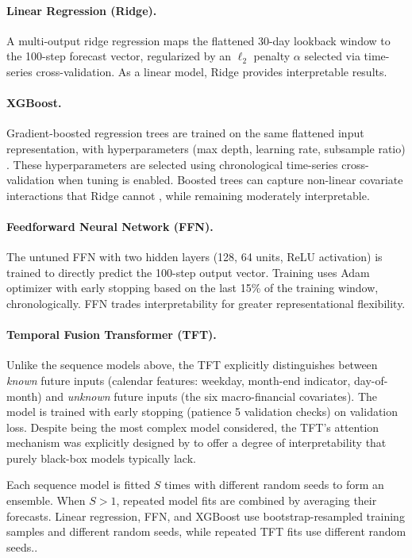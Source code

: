 \documentclass[11pt,a4paper]{article}
\begin{document}
\paragraph{Linear Regression (Ridge).}
A multi-output ridge regression maps the flattened 30-day lookback window
to the 100-step forecast vector, regularized by an $\ell_2$
penalty $\alpha$ selected via time-series cross-validation. As a linear model, Ridge provides interpretable results. 

\paragraph{XGBoost.}
Gradient-boosted regression trees are trained on the same flattened
input representation, with hyperparameters (max depth, learning rate,
subsample ratio) \citep{chen2016}. These hyperparameters are selected using chronological time-series cross-validation when tuning is enabled. Boosted trees can capture
non-linear covariate interactions that Ridge cannot
\citep[Ch.~10]{hastie2009}, while remaining moderately interpretable.

\paragraph{Feedforward Neural Network (FFN).}
The untuned FFN with two hidden layers (128, 64 units,
ReLU activation) is trained to directly predict the 100-step output
vector. Training uses Adam optimizer with early stopping based on the last 15\% of
the training window, chronologically. FFN trades interpretability for greater representational flexibility.

\paragraph{Temporal Fusion Transformer (TFT).}
Unlike the sequence models above, the TFT explicitly distinguishes
between \emph{known} future inputs (calendar features: weekday,
month-end indicator, day-of-month) and \emph{unknown} future inputs
(the six macro-financial covariates).
The model is trained with early stopping (patience 5 validation checks) on
validation loss. Despite being the most complex model considered,
the TFT's attention mechanism was explicitly designed by
\citet{lim2021} to offer a degree of interpretability that purely black-box models typically lack.

Each sequence model is fitted \(S\) times with different random seeds to form an
ensemble. When \(S>1\), repeated model fits are combined by averaging their forecasts. Linear regression, FFN, and XGBoost use bootstrap-resampled training
samples and different random seeds, while repeated TFT fits use different
random seeds..
\end{document}
